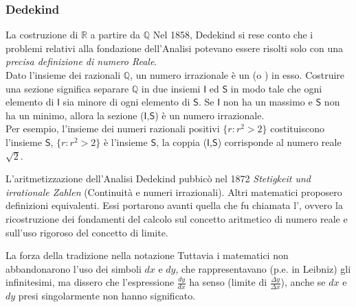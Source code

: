 \begin{frame}[label=Dedekind]
  \frametitle{Dedekind}
  \begin{block}{La costruzione di $\mathbb{R}$ a partire da $\mathbb{Q}$ \cite{Truss} }
    Nel 1858, Dedekind si rese conto che i problemi relativi alla fondazione dell'Analisi potevano essere risolti
    solo con una \textit{precisa definizione di numero Reale}.\\
    Dato l'insieme dei razionali $\mathbb{Q}$, un numero irrazionale è un  (o ) in esso.
    Costruire una sezione significa separare $\mathbb{Q}$ in due insiemi $\mathsf{I}$ ed $\mathsf{S}$ in modo tale che 
    ogni elemento di $\mathsf{I}$ sia minore di ogni elemento di $\mathsf{S}$. Se $\mathsf{I}$ non ha un massimo e 
    $\mathsf{S}$ non ha un minimo, allora la sezione ($\mathsf{I}$,$\mathsf{S}$) è un numero irrazionale.\\
    Per esempio, l'insieme dei numeri razionali positivi $\{r : r^2 > 2\}$ costituiscono l'insieme $\mathsf{S}$,
    $\{r : r^2 > 2\}$ è l'insieme $\mathsf{S}$, la coppia ($\mathsf{I}$,$\mathsf{S}$) corrisponde al numero reale $\sqrt{2}$.
  \end{block}
  \begin{block}{L'aritmetizzazione dell'Analisi}
    Dedekind pubbicò nel 1872 \textit{Stetigkeit und irrationale Zahlen} (Continuità e numeri irrazionali). Altri matematici proposero
    definizioni equivalenti. Essi portarono avanti quella che fu chiamata l', ovvero la ricostruzione
    dei fondamenti del calcolo sul concetto aritmetico di numero reale e sull'uso rigoroso del concetto di limite. 
  \end{block}

  \begin{block}{La forza della tradizione nella notazione}
    Tuttavia i matematici non abbandonarono l'uso dei simboli $dx$ e $dy$, che rappresentavano (p.e. in Leibniz) gli infinitesimi, 
    ma dissero che l'espressione $\frac{dy}{dx}$ ha senso (limite di $\frac{\Delta y}{\Delta x}$), anche se $dx$ e $dy$
    presi singolarmente non hanno significato. 
  \end{block}

\end{frame}